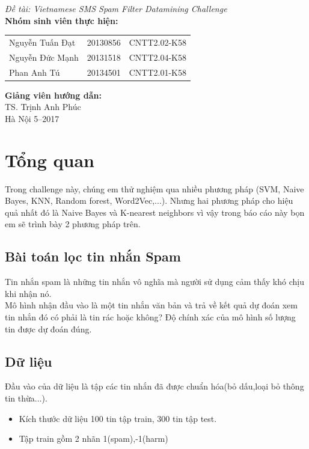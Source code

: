 \documentclass[a4paper,12pt]{report}
\renewcommand{\contentsname}{Mục lục}
\begin{document}
\begin{center}
{\fontsize{18}{20}\selectfont \emph{Đề tài:  Vietnamese SMS Spam Filter Datamining Challenge }}\\[2cm]
\hspace{-5cm}\fontsize{14}{16}\selectfont \textbf{Nhóm sinh viên thực hiện:}\\[0.1cm] 
\begin{longtable}{l c c}
Nguyễn Tuấn Đạt & 20130856 & CNTT2.02-K58 \\
Nguyễn Đức Mạnh & 20131518 & CNTT2.04-K58\\
Phan Anh Tú &   20134501 & CNTT2.01-K58\\
\end{longtable}

\hspace{-6cm}\fontsize{14}{16}\selectfont \textbf{Giảng viên hướng dẫn:}\\[0.1cm]
\hspace{-2.7cm}\fontsize{14}{16}\selectfont TS. Trịnh Anh Phúc \\[3.0cm]
\fontsize{16}{19}\selectfont Hà Nội 5--2017
\end{center}
\newpage
\pdfbookmark{\contentsname}{toc}
\tableofcontents

\chapter{Tổng quan}
Trong challenge này, chúng em thử nghiệm qua nhiều phương pháp (SVM, Naive Bayes, KNN, Random forest, Word2Vec,...). Nhưng hai phương pháp cho hiệu quả nhất đó là Naive Bayes và K-nearest neighbors vì vậy trong báo cáo này bọn em sẽ trình bày 2 phương pháp trên.
\section{Bài toán lọc tin nhắn Spam}
Tin nhắn spam là những tin nhắn vô nghĩa mà người sử dụng cảm thấy khó chịu khi nhận nó. \\

Mô hình nhận đầu vào là một tin nhắn văn bản và trả về kết quả dự đoán xem tin nhắn đó có phải là tin rác hoặc không? Độ chính xác của mô hình số lượng tin được dự đoán đúng.
\section{Dữ liệu}
Đầu vào của dữ liệu là tập các tin nhắn đã được chuẩn hóa(bỏ dấu,loại bỏ thông tin thừa...). \\
\begin{itemize}
\item Kích thước dữ liệu 100 tin tập train, 300 tin tập test.
\item Tập train gồm 2 nhãn 1(spam),-1(harm)
\end{itemize}
\end{document}

